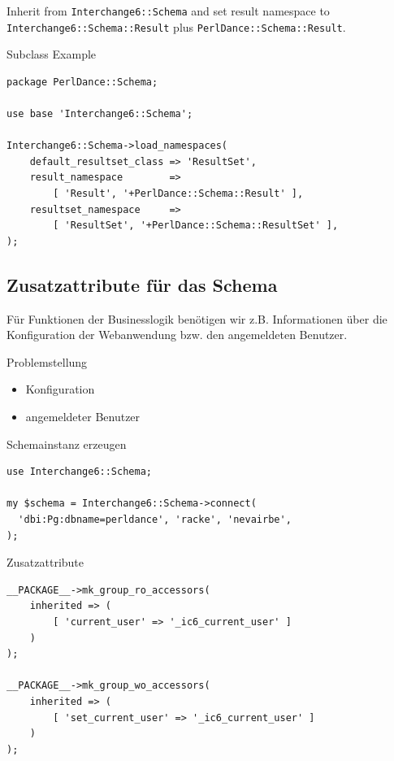 Inherit from \verb|Interchange6::Schema| and set result namespace to 
\verb|Interchange6::Schema::Result| plus \verb|PerlDance::Schema::Result|.

\begin{frame}[fragile]{Subclass Example}
\begin{lstlisting}
package PerlDance::Schema;

use base 'Interchange6::Schema';

Interchange6::Schema->load_namespaces(
    default_resultset_class => 'ResultSet',
    result_namespace        =>
        [ 'Result', '+PerlDance::Schema::Result' ],
    resultset_namespace     =>
        [ 'ResultSet', '+PerlDance::Schema::ResultSet' ],
);
\end{lstlisting}
\end{frame}

\subsection{Zusatzattribute für das Schema}

Für Funktionen der Businesslogik benötigen wir z.B.
Informationen über die Konfiguration der Webanwendung
bzw. den angemeldeten Benutzer.

\begin{frame}{Problemstellung}
\begin{itemize}
\item Konfiguration
\item angemeldeter Benutzer
\end{itemize}
\end{frame}

\begin{frame}[fragile]{Schemainstanz erzeugen}
\begin{lstlisting}
use Interchange6::Schema;

my $schema = Interchange6::Schema->connect(
  'dbi:Pg:dbname=perldance', 'racke', 'nevairbe', 
);
\end{lstlisting}
\end{frame}

\begin{frame}[fragile]{Zusatzattribute}
\begin{lstlisting}
__PACKAGE__->mk_group_ro_accessors(
    inherited => (
        [ 'current_user' => '_ic6_current_user' ]
    )
);

__PACKAGE__->mk_group_wo_accessors(
    inherited => (
        [ 'set_current_user' => '_ic6_current_user' ]
    )
);
\end{lstlisting}
\end{frame}

